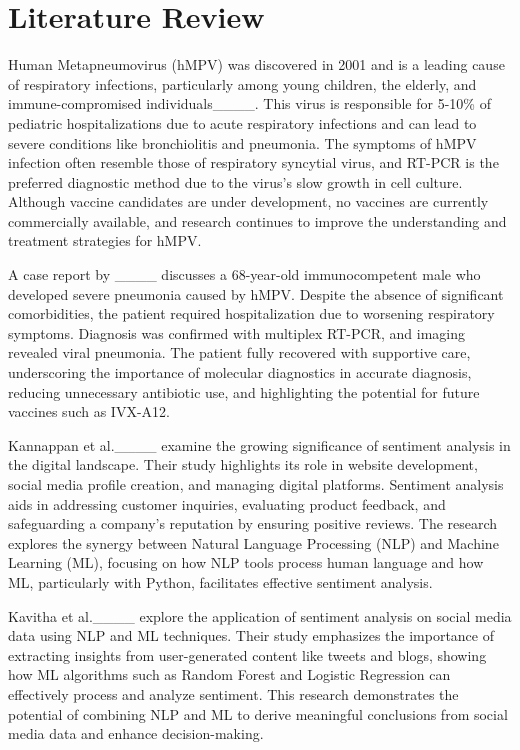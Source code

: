 \section{Literature Review}
Human Metapneumovirus (hMPV) was discovered in 2001 and is a leading cause of respiratory infections, particularly among young children, the elderly, and immune-compromised individuals____. This virus is responsible for 5-10\% of pediatric hospitalizations due to acute respiratory infections and can lead to severe conditions like bronchiolitis and pneumonia. The symptoms of hMPV infection often resemble those of respiratory syncytial virus, and RT-PCR is the preferred diagnostic method due to the virus's slow growth in cell culture. Although vaccine candidates are under development, no vaccines are currently commercially available, and research continues to improve the understanding and treatment strategies for hMPV.

A case report by ____ discusses a 68-year-old immunocompetent male who developed severe pneumonia caused by hMPV. Despite the absence of significant comorbidities, the patient required hospitalization due to worsening respiratory symptoms. Diagnosis was confirmed with multiplex RT-PCR, and imaging revealed viral pneumonia. The patient fully recovered with supportive care, underscoring the importance of molecular diagnostics in accurate diagnosis, reducing unnecessary antibiotic use, and highlighting the potential for future vaccines such as IVX-A12.

Kannappan et al.____ examine the growing significance of sentiment analysis in the digital landscape. Their study highlights its role in website development, social media profile creation, and managing digital platforms. Sentiment analysis aids in addressing customer inquiries, evaluating product feedback, and safeguarding a company's reputation by ensuring positive reviews. The research explores the synergy between Natural Language Processing (NLP) and Machine Learning (ML), focusing on how NLP tools process human language and how ML, particularly with Python, facilitates effective sentiment analysis.

Kavitha et al.____ explore the application of sentiment analysis on social media data using NLP and ML techniques. Their study emphasizes the importance of extracting insights from user-generated content like tweets and blogs, showing how ML algorithms such as Random Forest and Logistic Regression can effectively process and analyze sentiment. This research demonstrates the potential of combining NLP and ML to derive meaningful conclusions from social media data and enhance decision-making.

